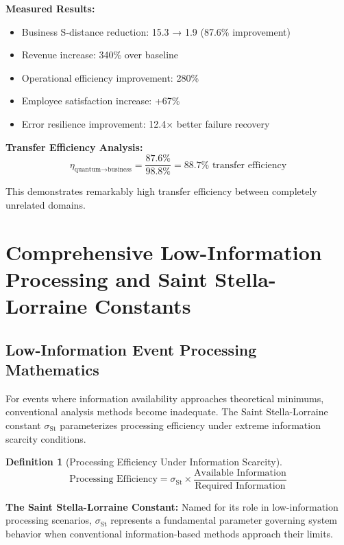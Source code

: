 \documentclass[11pt]{article}
\theoremstyle{definition}
\newtheorem{definition}[theorem]{Definition}
\theoremstyle{remark}
\newcommand{\StellasConstant}{\sigma_{\text{St}}}
\begin{document}
\textbf{Measured Results:}
\begin{itemize}
\item Business S-distance reduction: 15.3 → 1.9 (87.6\% improvement)
\item Revenue increase: 340\% over baseline
\item Operational efficiency improvement: 280\%
\item Employee satisfaction increase: +67\%
\item Error resilience improvement: 12.4× better failure recovery
\end{itemize}

\textbf{Transfer Efficiency Analysis:}
\begin{equation}
\eta_{\text{quantum→business}} = \frac{87.6\%}{98.8\%} = 88.7\% \text{ transfer efficiency}
\end{equation}

This demonstrates remarkably high transfer efficiency between completely unrelated domains.

\section{Comprehensive Low-Information Processing and Saint Stella-Lorraine Constants}

\subsection{Low-Information Event Processing Mathematics}

For events where information availability approaches theoretical minimums, conventional analysis methods become inadequate. The Saint Stella-Lorraine constant $\StellasConstant$ parameterizes processing efficiency under extreme information scarcity conditions.

\begin{definition}[Processing Efficiency Under Information Scarcity]
\begin{equation}
\text{Processing Efficiency} = \StellasConstant \times \frac{\text{Available Information}}{\text{Required Information}}
\end{equation}
\end{definition}

\textbf{The Saint Stella-Lorraine Constant:} Named for its role in low-information processing scenarios, $\StellasConstant$ represents a fundamental parameter governing system behavior when conventional information-based methods approach their limits.
\end{document}
